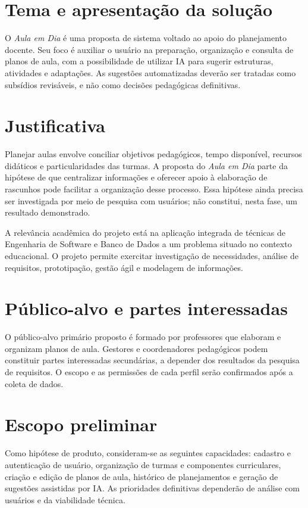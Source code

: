 \documentclass[12pt,a4paper,oneside]{report}
\begin{document}
\section{Tema e apresentação da solução}
O \textit{Aula em Dia} é uma proposta de sistema voltado ao apoio do planejamento docente. Seu foco é auxiliar o usuário na preparação, organização e consulta de planos de aula, com a possibilidade de utilizar IA para sugerir estruturas, atividades e adaptações. As sugestões automatizadas deverão ser tratadas como subsídios revisáveis, e não como decisões pedagógicas definitivas.

\section{Justificativa}
Planejar aulas envolve conciliar objetivos pedagógicos, tempo disponível, recursos didáticos e particularidades das turmas. A proposta do \textit{Aula em Dia} parte da hipótese de que centralizar informações e oferecer apoio à elaboração de rascunhos pode facilitar a organização desse processo. Essa hipótese ainda precisa ser investigada por meio de pesquisa com usuários; não constitui, nesta fase, um resultado demonstrado.

A relevância acadêmica do projeto está na aplicação integrada de técnicas de Engenharia de Software e Banco de Dados a um problema situado no contexto educacional. O projeto permite exercitar investigação de necessidades, análise de requisitos, prototipação, gestão ágil e modelagem de informações.

\section{Público-alvo e partes interessadas}
O público-alvo primário proposto é formado por professores que elaboram e organizam planos de aula. Gestores e coordenadores pedagógicos podem constituir partes interessadas secundárias, a depender dos resultados da pesquisa de requisitos. O escopo e as permissões de cada perfil serão confirmados após a coleta de dados.

\section{Escopo preliminar}
Como hipótese de produto, consideram-se as seguintes capacidades: cadastro e autenticação de usuário, organização de turmas e componentes curriculares, criação e edição de planos de aula, histórico de planejamentos e geração de sugestões assistidas por IA. As prioridades definitivas dependerão de análise com usuários e da viabilidade técnica.
\end{document}
